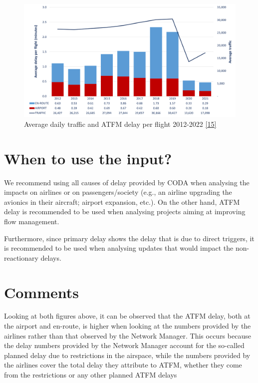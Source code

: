 \documentclass[
  11pt,
  a4paper,
]{book}
\begin{document}
\begin{figure}

{\centering \includegraphics{chapters/../figures/atfm_delay.png}

}

\caption{\label{fig-atfm-delay}Average daily traffic and ATFM delay per
flight 2012-2022 \protect\hyperlink{ref-nm2022}{{[}15{]}}}

\end{figure}

\hypertarget{when-to-use-the-input-1}{%
\section{When to use the input?}\label{when-to-use-the-input-1}}

We recommend using all causes of delay provided by CODA when analysing
the impacts on airlines or on passengers/society (e.g., an airline
upgrading the avionics in their aircraft; airport expansion, etc.). On
the other hand, ATFM delay is recommended to be used when analysing
projects aiming at improving flow management.

Furthermore, since primary delay shows the delay that is due to direct
triggers, it is recommended to be used when analysing updates that would
impact the non-reactionary delays.

\hypertarget{comments}{%
\section{Comments}\label{comments}}

Looking at both figures above, it can be observed that the ATFM delay,
both at the airport and en-route, is higher when looking at the numbers
provided by the airlines rather than that observed by the Network
Manager. This occurs because the delay numbers provided by the Network
Manager account for the so-called planned delay due to restrictions in
the airspace, while the numbers provided by the airlines cover the total
delay they attribute to ATFM, whether they come from the restrictions or
any other planned ATFM delays
\end{document}
